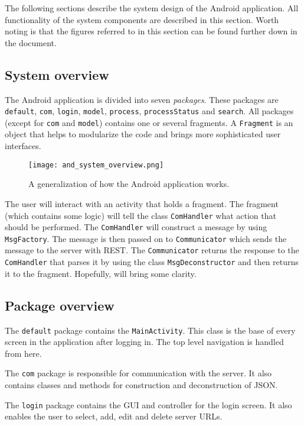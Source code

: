 The following sections describe the system design of the Android application. All functionality of the system components are described in this section. Worth noting is that the figures referred to in this section can be found further down in the document.

\subsection{System overview}
	The Android application is divided into seven \emph{packages}. These packages are \verb!default!, \verb!com!, \verb!login!, \verb!model!, \verb!process!, \verb!processStatus! and \verb!search!.
	All packages (except for \verb!com! and \verb!model!) contains one or several fragments. A \verb!Fragment! is an object that helps to modularize the code and brings more sophisticated user interfaces.

	\begin{figure}[h]
		\centering
		\texttt{[image: and\_system\_overview.png]}
		\caption{\label{fig:and_system_overview}A generalization of how the Android application works.}
	\end{figure}

	The user will interact with an activity that holds a fragment. The fragment (which contains some logic) will tell the class \verb!ComHandler! what action that should be performed. The \verb!ComHandler! will construct a message by using \verb!MsgFactory!. The message is then passed on to \verb!Communicator! which sends the message to the server with REST. The \verb!Communicator! returns the response to the \verb!ComHandler! that parses it by using the class \verb!MsgDeconstructor! and then returns it to the fragment. Hopefully,  will bring some clarity.
	
\subsection{Package overview}
	The \verb!default! package contains the \verb!MainActivity!. This class is the base of every screen in the application after logging in. The top level navigation is handled from here.

	The \verb!com! package is responsible for communication with the server. It also contains classes and methods for construction and deconstruction of JSON.

	The \verb!login! package contains the GUI and controller for the login screen. It also enables the user to select, add, edit and delete server URLs.
	
